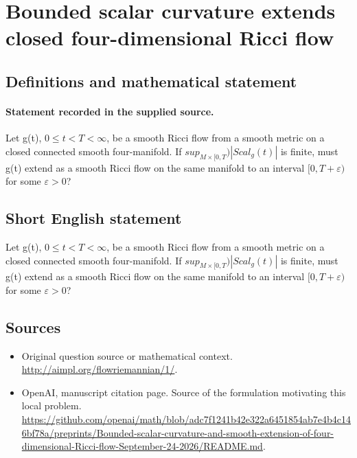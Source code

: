 \documentclass[11pt]{article}
\begin{document}
\section*{Bounded scalar curvature extends closed four-dimensional Ricci flow}\label{30007136}
\subsection{Definitions and mathematical statement}
\paragraph{Statement recorded in the supplied source.}
Let g(t), $0\leq t<T<\infty $, be a smooth Ricci flow from a smooth metric on a closed connected smooth four-manifold. If $sup_{M×[0,T})|Scal_g(t)|$ is finite, must g(t) extend as a smooth Ricci flow on the same manifold to an interval $[0,T+\varepsilon )$ for some $\varepsilon >0$?
\subsection{Short English statement}
Let g(t), $0\leq t<T<\infty $, be a smooth Ricci flow from a smooth metric on a closed connected smooth four-manifold. If $sup_{M×[0,T})|Scal_g(t)|$ is finite, must g(t) extend as a smooth Ricci flow on the same manifold to an interval $[0,T+\varepsilon )$ for some $\varepsilon >0$?
\subsection{Sources}
\begin{itemize}
\item[S1] Original question source or mathematical context.
\url{http://aimpl.org/flowriemannian/1/}.
\item[S2] OpenAI, manuscript citation page. Source of the formulation motivating this local problem.
\url{https://github.com/openai/math/blob/adc7f1241b42e322a6451854ab7e4b4c146bf78a/preprints/Bounded-scalar-curvature-and-smooth-extension-of-four-dimensional-Ricci-flow-September-24-2026/README.md}.
\end{itemize}
\end{document}
